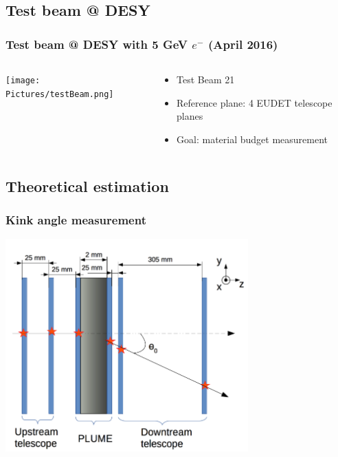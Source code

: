 \documentclass{beamer}
\begin{document}
  \subsection{Test beam @ DESY}

  \begin{frame}
    \frametitle{Test beam @ DESY with 5 GeV $e^-$ (April 2016)}
    
    \begin{columns}[c]
      \begin{column}{5cm}
        \begin{center}
          \texttt{[image: Pictures/testBeam.png]}
        \end{center}
      \end{column}
      \begin{column}{5cm}
        \begin{itemize}
          \item Test Beam 21
          \item Reference plane: 4 EUDET telescope planes
          \item Goal: material budget measurement
        \end{itemize}
      \end{column}
    \end{columns}
  \end{frame}

  \subsection{Theoretical estimation}
  
 
  \begin{frame}
    \frametitle{Kink angle measurement}

    \begin{center}
      \includegraphics[width = 0.7\textwidth]{Pictures/kinkAngleTB.png}
    \end{center}
  \end{frame}
\end{document}
